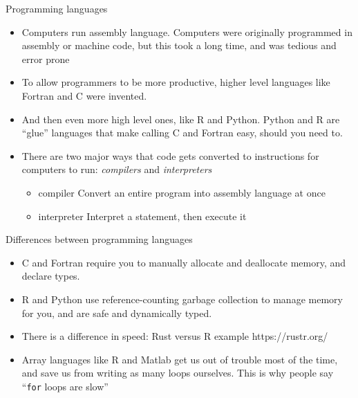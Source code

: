 \documentclass{beamer}
\begin{document}
\begin{frame}{Programming languages}
	\begin{itemize}	
		\item Computers run assembly language. Computers were originally programmed in assembly or machine code, but this took a long time, and was tedious and error prone
		\item To allow programmers to be more productive, higher level languages like Fortran and C were invented.
\item  And then even more high level ones, like R and Python. Python and R are ``glue'' languages that make calling C and Fortran easy, should you need to.
		\item There are two major ways that code gets converted to instructions for computers to run: \emph{compilers} and \emph{interpreters}
			\begin{itemize}
				\item{compiler} Convert an entire program into assembly language at once
				\item{interpreter} Interpret a statement, then execute it
			\end{itemize}
	\end{itemize}
\end{frame}

\begin{frame}{Differences between programming languages}
	\begin{itemize}	
		\item C and Fortran require you to manually allocate and deallocate memory, and declare types. 
		\item R and Python use reference-counting garbage collection to manage memory for you, and are safe and dynamically typed. 
\item There is a difference in speed: Rust versus R example https://rustr.org/
\item Array languages like R and Matlab get us out of trouble most of the time, and save us from writing as many loops ourselves. This is why people say ``\texttt{for} loops are slow''
	\end{itemize}
\end{frame}
\end{document}
